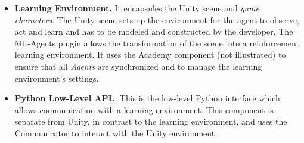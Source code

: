\begin{itemize}
    \item \textbf{Learning Environment.} It encapsules the Unity scene and \textit{game characters}. The Unity scene sets up the environment for the agent to observe, act and learn and has to be modeled and constructed by the developer. The ML-Agents plugin allows the transformation of the scene into a reinforcement learning environment. It uses the Academy component (not illustrated) to ensure that all \textit{Agents} are synchronized and to manage the learning environment's settings.

    \item \textbf{Python Low-Level API.}. This is the low-level Python interface which allows communication with a learning environment. This component is separate from Unity, in contrast to the learning environment, and uses the Communicator to interact with the Unity environment.
    

\end{itemize}
